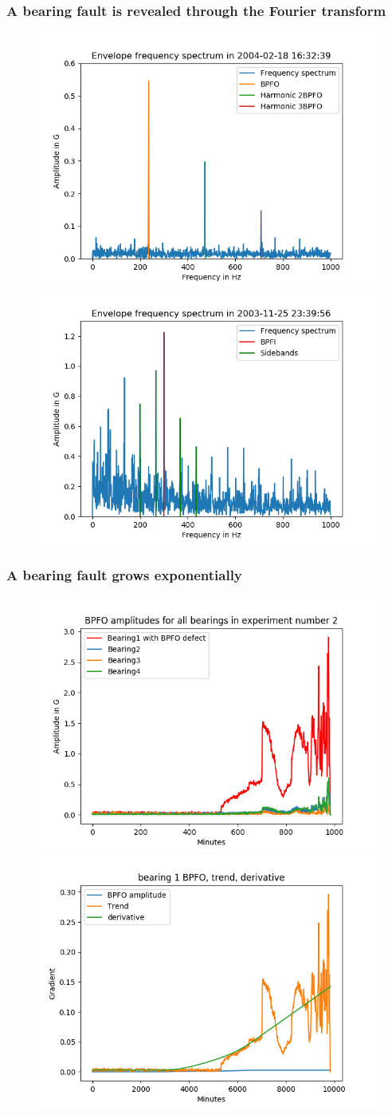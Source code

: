 \documentclass{beamer}
\begin{document}


\begin{frame}
	\frametitle{A bearing fault is revealed through the Fourier transform}
	\begin{figure}[H]
		\centering
		\includegraphics[width=0.45\linewidth]{last_day_spectrum_bpfo}
		\includegraphics[width=0.45\linewidth]{bpfi_sidebands}
	\end{figure}
\end{frame}



\begin{frame}
	\frametitle{A bearing fault grows exponentially}
	\begin{figure}[H]
		\centering
		\includegraphics[width=0.45\linewidth]{bpfo}
		\includegraphics[width=0.45\linewidth]{exp}
	\end{figure}
\end{frame}
\end{document}
